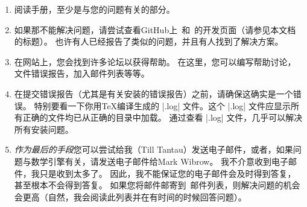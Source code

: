 \iffalse
\begin{enumerate}
    \item Read the manual, at least the part that has to do with your
        problem.
    \item If that does not solve the problem, try having a look at the GitHub development page for \pgfname\ and \tikzname\ (see the title of this document). Perhaps someone has already reported a similar problem and someone has found a solution.
    \item On the website you will find numerous forums for getting help. There, you can write to help forums, file bug reports, join mailing lists, and so on.
    \item Before you file a bug report, especially a bug report concerning the installation, make sure that this is really a bug. In particular, have a look at the |.log| file that results when you \TeX\ your files. This |.log| file should show that all the right files are loaded from the right directories. Nearly all installation problems can be resolved by looking at the |.log| file.
    \item \emph{As a last resort} you can try to email me (Till Tantau) or, if the problem concerns the mathematical engine, Mark Wibrow. I do not mind getting emails, I simply get way too many of them. Because of this, I cannot guarantee that your emails will be answered in a  timely fashion or even at all. Your chances that your problem will be fixed are somewhat higher if you mail to the \pgfname\ mailing list (naturally, I read this list and answer questions when I have the time).
\end{enumerate}
\fi

\begin{enumerate}
    \item 阅读手册，至少是与您的问题有关的部分。
    \item 如果那不能解决问题，请尝试查看GitHub上\pgfname\ 和\tikzname\ 的开发页面（请参见本文档的标题）。 也许有人已经报告了类似的问题，并且有人找到了解决方案。
    \item 在网站上，您会找到许多论坛以获得帮助。 在这里，您可以编写帮助讨论，文件错误报告，加入邮件列表等等。
    \item 在提交错误报告（尤其是有关安装的错误报告）之前，请确保这确实是一个错误。 特别要看一下你用\TeX 编译生成的 |.log| 文件。这个 |.log| 文件应显示所有正确的文件均已从正确的目录中加载。 通过查看 |.log| 文件，几乎可以解决所有安装问题。
    \item \emph{作为最后的手段}您可以尝试给我（Till Tantau）发送电子邮件，或者，如果问题与数学引擎有关，请发送电子邮件给Mark Wibrow。 我不介意收到电子邮件，我只是收到太多了。 因此，我不能保证您的电子邮件会及时得到答复，甚至根本不会得到答复。 如果您将邮件邮寄到\pgfname\ 邮件列表，则解决问题的机会会更高（自然，我会阅读此列表并在有时间的时候回答问题）。
\end{enumerate}